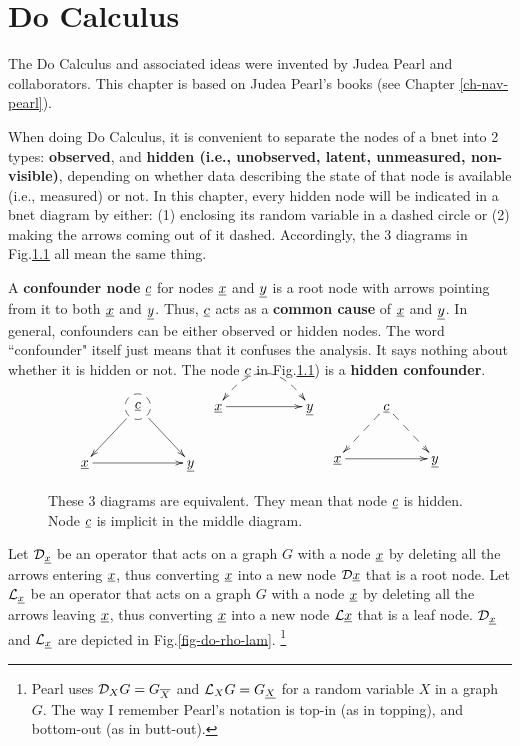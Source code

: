 \chapter{Do Calculus}\label{ch-do-calc}


The Do Calculus and associated ideas were
invented by
Judea Pearl and collaborators.
This chapter is 
based on Judea Pearl's
books (see Chapter \ref{ch-nav-pearl}).


When
doing
Do Calculus,
it is 
convenient
to separate
the nodes
of a bnet
into
2  types:
{\bf observed},
and {\bf hidden (i.e., unobserved, latent,
unmeasured, non-visible)},
depending
on
whether data
describing
the
state 
of that
node
is available  (i.e., measured) or not.
In this chapter, every
hidden node will 
be indicated 
in a bnet
diagram by
either: (1)
enclosing
its random variable
in a dashed circle or
(2) making
the arrows
coming
out of it
dashed.
Accordingly, 
the 
3 diagrams 
in
Fig.\ref{fig-hidden-dashes}
all mean the same thing.

A {\bf confounder node} ${\underline{c}}$
for nodes ${\underline{x}}$ and ${\underline{y}}$
is a root node
with arrows
pointing
from it to
both
${\underline{x}}$ and ${\underline{y}}$.
Thus, ${\underline{c}}$ acts as a {\bf common cause}
of ${\underline{x}}$ and ${\underline{y}}$.
In general, confounders
can be either observed
or hidden nodes.
The word ``confounder" itself
just means that it confuses
the analysis.
It says nothing about
whether it is hidden or not.
The node
${\underline{c}}$
in Fig.\ref{fig-hidden-dashes})
is a {\bf hidden confounder}.

\begin{figure}[h!]
$$\xymatrix{
&*++[F-o]{\rvc}\ar[dl]\ar[dr]
\\
\rvx\ar[rr]&&\rvy
}
\;\;\;
\xymatrix{
\rvx\ar@{-->}@{<-->}@/^2pc/[rr]
\ar[rr]&&\rvy
}
\;\;\;
\xymatrix{
&\rvc\ar@{-->}[dl]\ar@{-->}[dr]
\\
\rvx\ar[rr]&&\rvy
}$$
\caption{
These 3 diagrams
are equivalent.
They
mean that node ${\underline{c}}$
is hidden.
Node ${\underline{c}}$
is implicit
in the
middle diagram.}
\label{fig-hidden-dashes}
\end{figure}



Let
${\cal D}_{\underline{x}}$
be an operator 
that acts on a graph $G$
with a node
${\underline{x}}$
by
deleting
all
the 
arrows
entering
${\underline{x}}$,
thus
converting
${\underline{x}}$
into
a new
node ${\cal D} {\underline{x}}$
that
is a root node.
Let
${\cal L}_{\underline{x}}$
be an operator that acts
on a graph $G$
with a node
${\underline{x}}$
by deleting
all
the 
arrows
leaving
${\underline{x}}$,
thus
converting
${\underline{x}}$
into
a new
node ${\cal L} {\underline{x}}$
that
is a leaf node.
${\cal D}_{\underline{x}}$
and
${\cal L}_{\underline{x}}$
are
depicted
in Fig.\ref{fig-do-rho-lam}.
\footnote{Pearl 
uses ${\cal D}_X G=
G_{\overline{X}}
$
and 
${\cal L}_X G=
G_{\underline{X}}$
for a random variable $X$
in a graph $G$.
The way I remember
Pearl's notation is top-in (as in topping), and 
bottom-out (as in butt-out).}




